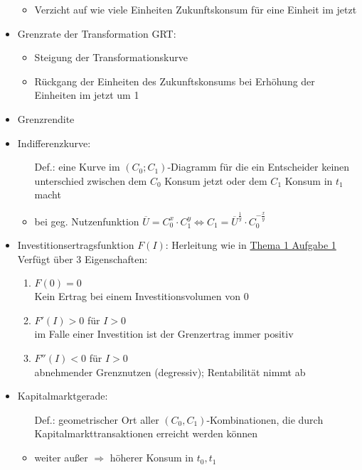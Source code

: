 \begin{itemize}
\begin{itemize}
				\item Verzicht auf wie viele Einheiten Zukunftskonsum für eine Einheit im jetzt
			\end{itemize}
		\item Grenzrate der Transformation GRT: \label{GRT}
			\begin{itemize}
				\item Steigung der Transformationskurve
				\item Rückgang der Einheiten des Zukunftskonsums bei Erhöhung der Einheiten im jetzt um 1
			\end{itemize}
		\item Grenzrendite \label{Grenzrendite}\\ %
		\item Indifferenzkurve:
			\begin{itemize}
				\item[Def.:] eine Kurve im $(C_0;C_1)$-Diagramm für die ein Entscheider keinen unterschied zwischen dem $C_0$ Konsum jetzt oder dem $C_1$ Konsum in $t_1$ macht
				\item bei geg. Nutzenfunktion $\overline{U}=C_0^x\cdot C_1^y \Leftrightarrow C_1 = \overline{U}^{\frac{1}{y}}\cdot C_0^{-\frac{x}{y}} $
			\end{itemize}		
		\item Investitionsertragsfunktion $F(I)$: Herleitung wie in \hyperref[Thema1Aufgabe1]{Thema 1 Aufgabe 1} \label{Investitionsertragsfunktion}\\
			Verfügt über 3 Eigenschaften: \begin{enumerate}
				\item $F(0)=0$\\ Kein Ertrag bei einem Investitionsvolumen von 0
				\item $F'(I) >0$ für $I>0$\\ im Falle einer Investition ist der Grenzertrag immer positiv
				\item $F''(I) <0$ für $I>0$\\ abnehmender Grenznutzen (degressiv); Rentabilität nimmt ab
			\end{enumerate}
		\item Kapitalmarktgerade: \label{Kapitalmarktgerade}
			\begin{itemize}
				\item[Def.:] geometrischer Ort aller $(C_0,C_1)$-Kombinationen, die durch Kapitalmarkttransaktionen erreicht werden können
				\item weiter außer $\Rightarrow$ höherer Konsum in $t_0, t_1$

\end{itemize}
\end{itemize}
